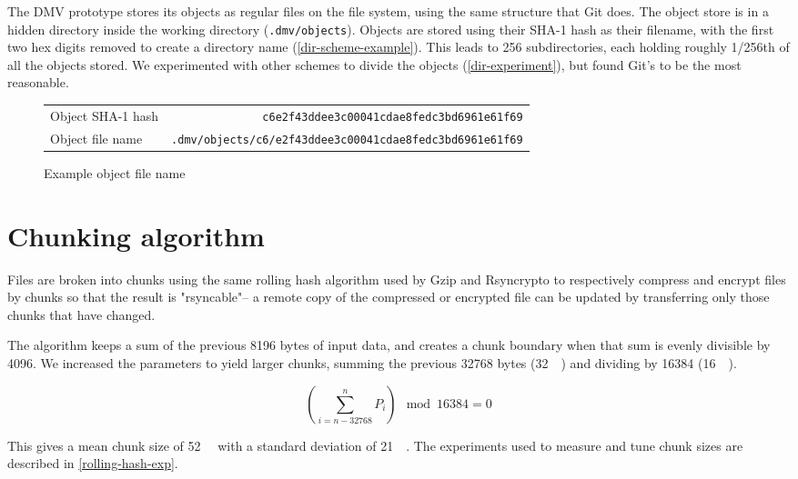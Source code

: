 The DMV prototype stores its objects as regular files on the file system, using
the same structure that Git does. The object store is in a hidden directory
inside the working directory (\lstinline{.dmv/objects}). Objects are stored
using their SHA-1 hash as their filename, with the first two hex digits removed
to create a directory name (\autoref{dir-scheme-example}). This leads to
\num{256} subdirectories, each holding roughly \num{1/256}th of all the objects
stored. We experimented with other schemes to divide the objects
(\autoref{dir-experiment}), but found Git's to be the most
reasonable.

\begin{figure}[h]
    \caption{Example object file name}
    \label{dir-scheme-example}
    \begin{tabular}{ l r }
        Object SHA-1 hash & \lstinline{c6e2f43ddee3c00041cdae8fedc3bd6961e61f69} \\
        Object file name & \lstinline{.dmv/objects/c6/e2f43ddee3c00041cdae8fedc3bd6961e61f69} \\
    \end{tabular}
\end{figure}

%


\section{Chunking algorithm}\label{chunking-algoritm}

Files are broken into chunks using the same rolling hash algorithm used by Gzip
and Rsyncrypto\cite{rsyncrypto_algorithm} to respectively compress and encrypt
files by chunks so that the result is "rsyncable"-- a remote copy of the
compressed or encrypted file can be updated by transferring only those chunks
that have changed.

The algorithm keeps a sum of the previous \num{8196} bytes of input data, and
creates a chunk boundary when that sum is evenly divisible by \num{4096}. We
increased the parameters to yield larger chunks, summing the previous
\num{32768} bytes (\SI{32}{\kibi\byte}) and dividing by \num{16384}
(\SI{16}{\kibi\relax}).

\begin{equation*}
    \left( \sum_{i = n - \num{32768} }^{n}{P_i} \right) \mod \num{16384} = 0
\end{equation*}

This gives a mean chunk size of \SI{52}{\kibi\byte} with a standard deviation of
\SI{21}{\kibi\byte}. The experiments used to measure and tune chunk sizes are
described in \autoref{rolling-hash-exp}.
